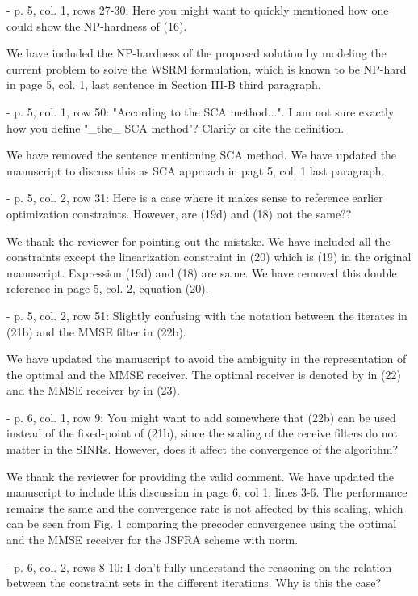 \begin{itemize}
\begin{itemize}
 - p. 5, col. 1, rows 27-30: Here you might want to quickly mentioned how one could show the NP-hardness of (16).

\resp We have included the NP-hardness of the proposed solution by modeling the current problem to solve the \ac{WSRM} formulation, which is known to be NP-hard in page 5, col. 1, last sentence in Section III-B third paragraph. 

 - p. 5, col. 1, row 50: "According to the SCA method...". I am not sure exactly how you define "\_the\_ SCA method"? Clarify or cite the definition.

\resp We have removed the sentence mentioning SCA method. We have updated the manuscript to discuss this as SCA approach in pagt 5, col. 1 last paragraph.

 - p. 5, col. 2, row 31: Here is a case where it makes sense to reference earlier optimization constraints. However, are (19d) and (18) not the same??

\resp We thank the reviewer for pointing out the mistake. We have included all the constraints except the linearization constraint in (20) which is (19) in the original manuscript. Expression (19d) and (18) are same. We have removed this double reference in page 5, col. 2, equation (20).

 - p. 5, col. 2, row 51: Slightly confusing with the notation between the iterates in (21b) and the MMSE filter in (22b).

\resp We have updated the manuscript to avoid the ambiguity in the representation of the optimal and the MMSE receiver. The optimal receiver is denoted by  in (22) and the MMSE receiver by  in (23).

 - p. 6, col. 1, row 9: You might want to add somewhere that (22b) can be used instead of the fixed-point of (21b), since the scaling of the receive filters do not matter in the SINRs. However, does it affect the convergence of the algorithm?

\resp We thank the reviewer for providing the valid comment. We have updated the manuscript to include this discussion in page 6, col 1, lines 3-6. The performance remains the same and the convergence rate is not affected by this scaling, which can be seen from Fig. 1 comparing the precoder convergence using the optimal and the MMSE receiver for the JSFRA scheme with  norm.

 - p. 6, col. 2, rows 8-10: I don't fully understand the reasoning on the relation between the constraint sets in the different iterations. Why is this the case?


\end{itemize}
\end{itemize}
